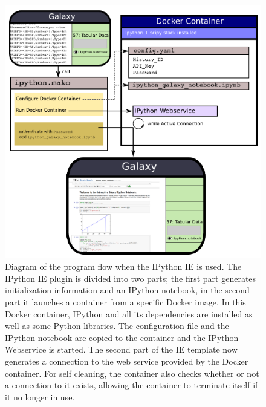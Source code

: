\documentclass{bioinfo}
\begin{document}
\begin{methods}
\begin{figure}[!tpb]
\centerline{\includegraphics{diagram.pdf}}
\caption{Diagram of the program flow when the IPython IE is used. The IPython IE plugin is divided into two parts;
the first part generates initialization information and an IPython notebook, in the second part it launches a container
from a specific Docker image. In this Docker container, IPython and all its dependencies are installed as well as some Python
libraries. The configuration file and the IPython notebook are copied to the container and the IPython Webservice is started.
The second part of the IE template now generates a connection to the web service provided by the Docker container.
For self cleaning, the container also checks whether or not a connection to it exists, allowing the container to
terminate itself if it no longer in use.}
\label{fig:diagram}
\end{figure}


\end{methods}


%
%
\end{document}

